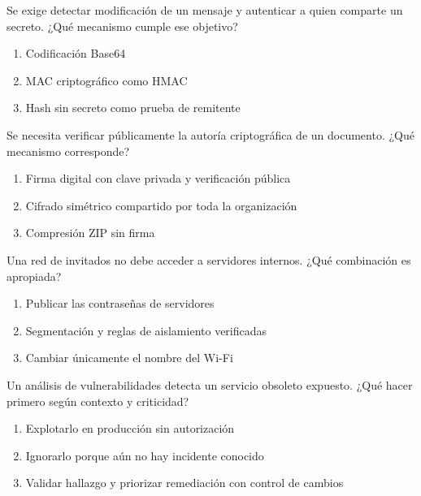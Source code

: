 \noindent\begin{minipage}{\linewidth}\setlength{\parskip}{4pt}\label{q:R-076}
Se exige detectar modificación de un mensaje y autenticar a quien comparte un secreto. ¿Qué mecanismo cumple ese objetivo?
\begin{enumerate}[label=\Alph*),nosep]
\item Codificación Base64
\item MAC criptográfico como HMAC
\item Hash sin secreto como prueba de remitente
\end{enumerate}\end{minipage}\par\medskip

\noindent\begin{minipage}{\linewidth}\setlength{\parskip}{4pt}\label{q:R-077}
Se necesita verificar públicamente la autoría criptográfica de un documento. ¿Qué mecanismo corresponde?
\begin{enumerate}[label=\Alph*),nosep]
\item Firma digital con clave privada y verificación pública
\item Cifrado simétrico compartido por toda la organización
\item Compresión ZIP sin firma
\end{enumerate}\end{minipage}\par\medskip

\noindent\begin{minipage}{\linewidth}\setlength{\parskip}{4pt}\label{q:R-078}
Una red de invitados no debe acceder a servidores internos. ¿Qué combinación es apropiada?
\begin{enumerate}[label=\Alph*),nosep]
\item Publicar las contraseñas de servidores
\item Segmentación y reglas de aislamiento verificadas
\item Cambiar únicamente el nombre del Wi-Fi
\end{enumerate}\end{minipage}\par\medskip

\noindent\begin{minipage}{\linewidth}\setlength{\parskip}{4pt}\label{q:R-079}
Un análisis de vulnerabilidades detecta un servicio obsoleto expuesto. ¿Qué hacer primero según contexto y criticidad?
\begin{enumerate}[label=\Alph*),nosep]
\item Explotarlo en producción sin autorización
\item Ignorarlo porque aún no hay incidente conocido
\item Validar hallazgo y priorizar remediación con control de cambios
\end{enumerate}\end{minipage}\par\medskip

